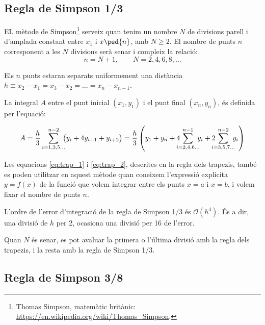\subsection{Regla de Simpson 1/3}

EL mètode de Simpson\footnote{Thomas Simpson, matemàtic britànic: \href{https://en.wikipedia.org/wiki/Thomas_Simpson}{https:/\!\!/en.wikipedia.org/wiki/Thomas\_Simpson}.} serveix quan tenim un nombre  $N$ de divisions parell i d'amplada constant entre $x_1$ i $x\ped{n}$, amb $N \geq 2$.  El nombre de punts $n$ corresponent a les  $N$ divisions serà senar i compleix la relació: 
\begin{equation}
	n = N+1, \qquad N = 2, 4, 6, 8, \dots
\end{equation}

Els $n$ punts estaran separats uniformement una distància $h \equiv x_2-x_1 = x_3-x_2 = \dots = x_n-x_{n-1}$.

La integral $A$ entre el punt inicial $(x_1, y_1)$ i el punt final $(x_n, y_n)$, és definida per l'equació:

 \begin{equation}\label{eq:simp_1_3}
   A =  \frac{h}{3} \sum_{i=1,3,5\dots}^{n-2} \hspace{-0.5em} \big( y_i + 4 y_{i+1} + y_{i+2} \big) =
   \frac{h}{3} \left( y_1 + y_n + 4 \hspace{-0.7em} \sum_{i=2,4,6\dots}^{n-1} \hspace{-0.5em} y_i +
   2 \hspace{-0.7em} \sum_{i=3,5,7\dots}^{n-2} \hspace{-0.5em} y_i \right)
 \end{equation}

Les equacions \eqref{eq:trap_1} i \eqref{eq:trap_2}, descrites en la regla dels trapezis, també es poden utilitzar en aquest mètode quan  coneixem l'expressió explícita $y=f(x)$ de la funció que volem integrar entre els punts $x=a$ i $x=b$, i volem fixar el nombre de punts $n$.

L'ordre de l'error d'integració de la regla de Simpson 1/3 és $\mathscr{O}(h^4)$. És a dir, una divisió de $h$ per 2, ocasiona una divisió per 16 de l'error.

Quan $N$ és senar, es pot avaluar la primera o l'última divisió amb la  regla dels trapezis, i la resta amb la regla de Simpson 1/3.

 \subsection{Regla de Simpson 3/8}

